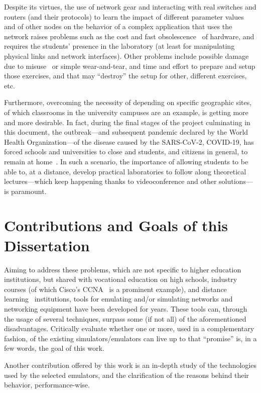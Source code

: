 Despite its virtues, the use of network gear and interacting with real switches and routers (and their protocols) to learn the impact of different parameter values and of other nodes on the behavior of a complex application that uses the network raises problems such as the cost and fast obsolescence~\cite{automaticnetconfiggns} of hardware, and requires the students' presence in the laboratory (at least for manipulating physical links and network interfaces).
Other problems include possible damage due to misuse~\cite{teachinginovation} or simple wear-and-tear, and time and effort to prepare and setup those exercises, and that may ``destroy'' the setup for other, different exercises, etc.

Furthermore, overcoming the necessity of depending on specific geographic sites, of which classrooms in the university campuses are an example, is getting more and more desirable.
In fact, during the final stages of the project culminating in this document, the outbreak---and subsequent pandemic declared by the World Health Organization---of the disease caused by the SARS-CoV-2, COVID-19, has forced schools and universities to close and students, and citizens in general, to remain at home~\cite{covid19}.
In such a scenario, the importance of allowing students to be able to, at a distance, develop practical laboratories to follow along theoretical lectures---which keep happening thanks to videoconference and other solutions---is paramount.

\section{Contributions and Goals of this Dissertation}

Aiming to address these problems, which are not specific to higher education institutions, but shared with vocational education on high schools, industry courses (of which Cisco's CCNA~\cite{ccna} is a prominent example), and distance learning~\cite{networkvirtwithgns} institutions, tools for emulating and/or simulating networks and networking equipment have been developed for years.
These tools can, through the usage of several techniques, surpass some (if not all) of the aforementioned disadvantages.
Critically evaluate whether one or more, used in a complementary fashion, of the existing simulators/emulators can live up to that ``promise'' is, in a few words, the goal of this work.

Another contribution offered by this work is an in-depth study of the technologies used by the selected emulators, and the clarification of the reasons behind their behavior, performance-wise.

